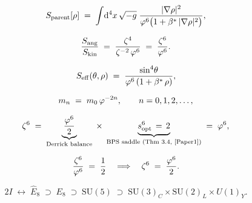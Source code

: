 \begin{equation}
  S_{\mathrm{parent}}[\rho]
  \;=\; \int\!\mathrm{d}^4x\,\sqrt{-g}\;
  \frac{|\nabla\rho|^2}{\varphi^6\bigl(1 + \beta^{*}\,|\nabla\rho|^2\bigr)},
  \label{P6:eq:parent_action}
\end{equation}

\begin{equation}
  \frac{S_{\mathrm{ang}}}{S_{\mathrm{kin}}}
  \;=\; \frac{\zeta^4}{\zeta^{-2}\,\varphi^6}
  \;=\; \frac{\zeta^6}{\varphi^6}.
  \label{P6:eq:ratio_zeta}
\end{equation}

\begin{equation}
  S_{\mathrm{eff}}(\theta, \rho)
  \;=\; \frac{\sin^4\!\theta}{\varphi^6\,(1 + \beta^{*}\,\rho)},
  \label{P6:eq:seff_axiom}
\end{equation}

\begin{equation}
  m_n \;=\; m_0\,\varphi^{-2n}, \qquad n = 0, 1, 2, \ldots,
  \label{P6:eq:tower_intro}
\end{equation}

\begin{equation}
  \zeta^6
  \;=\; \underbrace{\frac{\varphi^6}{2}}_{\text{Derrick balance}}
  \;\times\; \underbrace{s_{\mathrm{opt}}^6\,=\,2}_{\text{BPS saddle (Thm~3.4,~\cite{Paper1})}}
  \;=\; \varphi^6,
  \label{P6:eq:zeta_full}
\end{equation}

\begin{equation}
  \frac{\zeta^6}{\varphi^6} \;=\; \frac{1}{2}
  \quad\Longrightarrow\quad
  \zeta^6 \;=\; \frac{\varphi^6}{2}.
  \label{P6:eq:zeta_half}
\end{equation}

\begin{equation}
  2I \;\longleftrightarrow\; \hat{E}_8 \;\supset\;
  E_8 \;\supset\; \mathrm{SU}(5) \;\supset\;
  \mathrm{SU}(3)_C\times\mathrm{SU}(2)_L\times U(1)_Y.
  \label{P1:eq:chain}
\end{equation}

